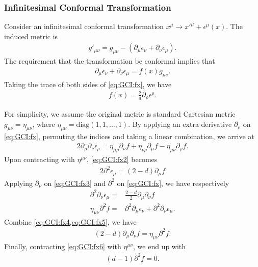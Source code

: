 \documentclass[10pt]{article}
\begin{document}
\subsubsection{Infinitesimal Conformal Transformation}
Consider an infinitesimal conformal transformation $x^\mu\to x'^{\mu}+\epsilon^\mu(x)$.
The induced metric is
\begin{align}
    g'_{\mu\nu}=g_{\mu\nu}-\left(\partial_\mu\epsilon_\nu+\partial_\nu\epsilon_\mu\right).
\end{align}
The requirement that the transformation be conformal implies that
\begin{align}
    \partial_\mu\epsilon_\nu+\partial_\nu\epsilon_\mu=f(x)g_{\mu\nu}.\label{eq:GCI:fx}
\end{align}
Taking the trace of both sides of \cref{eq:GCI:fx}, we have
\begin{align}
    f(x)=\frac{2}{d}\partial_\rho\epsilon^\rho.\label{eq:GCI:fx1}
\end{align}

For simplicity, we assume the original metric is standard Cartesian metric $g_{\mu\nu}=\eta_{\mu\nu}$, where $\eta_{\mu\nu}=\mathrm{diag}(1,1,\dots,1)$.
By applying an extra derivative $\partial_\rho$ on \cref{eq:GCI:fx}, permuting the indices and taking a linear combination, we arrive at
\begin{align}
    2\partial_\mu\partial_\nu\epsilon_\rho=\eta_{\mu\rho}\partial_\nu f+\eta_{\nu\rho}\partial_\mu f-\eta_{\mu\nu}\partial_\rho f.\label{eq:GCI:fx2}
\end{align}
Upon contracting with $\eta^{\mu\nu}$, \cref{eq:GCI:fx2} becomes
\begin{align}
    2\partial^2\epsilon_\mu=(2-d)\partial_\mu f \label{eq:GCI:fx3}
\end{align}
Applying $\partial_\nu$ on \cref{eq:GCI:fx3} and $\partial^2$ on \cref{eq:GCI:fx}, we have respectively
\begin{align}
    \partial^2\partial_\nu\epsilon_\mu= & \frac{2-d}{2}\partial_\mu\partial_\nu f\label{eq:GCI:fx4}                                \\
    \eta_{\mu\nu}\partial^2 f=          & \partial^2\partial_\mu\epsilon_\nu+\partial^2\partial_\nu\epsilon_\mu.\label{eq:GCI:fx5}
\end{align}
Combine \cref{eq:GCI:fx4,eq:GCI:fx5}, we have
\begin{align}
    (2-d)\partial_\mu\partial_\nu f=\eta_{\mu\nu}\partial^2 f.\label{eq:GCI:fx6}
\end{align}
Finally, contracting \cref{eq:GCI:fx6} with $\eta^{\mu\nu}$, we end up with
\begin{align}
    (d-1)\partial^2 f=0.\label{eq:GCI:fx7}
\end{align}
\end{document}
